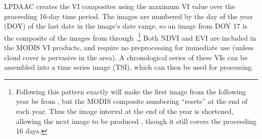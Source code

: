 LPDAAC creates the VI composites using the maximum VI value over the proceeding 16-day time period. The images are numbered by the day of the year (DOY) of the last date in the image's date range, so an image from DOY 17 is the composite of the images from  through .\footnote{Following this pattern exactly will make the first image from the following year be from , but the MODIS composite numbering ``resets'' at the end of each year. Thus the image interval at the end of the year is shortened, allowing the next image to be produced , though it still covers the proceeding 16 days.} Both NDVI and EVI are included in the MODIS VI products, and require no preprocessing for immediate use (unless cloud cover is pervasive in the area). A chronological series of these VIs can be assembled into a time series image (TSI), which can then be used for processing.

